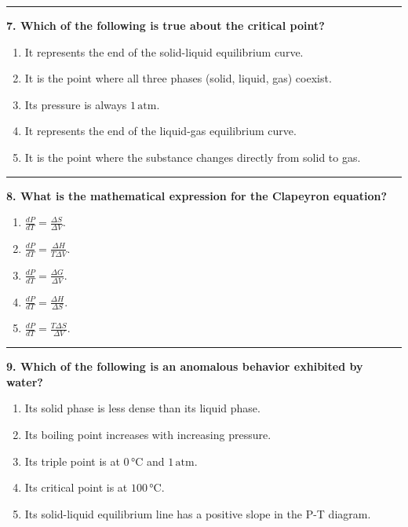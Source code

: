 \documentclass[
  9pt,
]{extbook}
\providecommand{\tightlist}{%
  \setlength{\itemsep}{0pt}\setlength{\parskip}{0pt}}
\theoremstyle{definition}
\theoremstyle{definition}
\theoremstyle{definition}
\theoremstyle{definition}
\theoremstyle{remark}
\begin{document}
\begin{center}\rule{0.5\linewidth}{0.5pt}\end{center}

\textbf{7. Which of the following is true about the critical point?}

\begin{enumerate}
\def\labelenumi{\alph{enumi}.}
\tightlist
\item
  It represents the end of the solid-liquid equilibrium curve.
\item
  It is the point where all three phases (solid, liquid, gas) coexist.
\item
  Its pressure is always \(1\,\text{atm}\).
\item
  It represents the end of the liquid-gas equilibrium curve.
\item
  It is the point where the substance changes directly from solid to gas.
\end{enumerate}

\begin{center}\rule{0.5\linewidth}{0.5pt}\end{center}

\textbf{8. What is the mathematical expression for the Clapeyron equation?}

\begin{enumerate}
\def\labelenumi{\alph{enumi}.}
\tightlist
\item
  \(\frac{dP}{dT} = \frac{\Delta S}{\Delta V}\).
\item
  \(\frac{dP}{dT} = \frac{\Delta H}{T\Delta V}\).
\item
  \(\frac{dP}{dT} = \frac{\Delta G}{\Delta V}\).
\item
  \(\frac{dP}{dT} = \frac{\Delta H}{\Delta S}\).
\item
  \(\frac{dP}{dT} = \frac{T\Delta S}{\Delta V}\).
\end{enumerate}

\begin{center}\rule{0.5\linewidth}{0.5pt}\end{center}

\textbf{9. Which of the following is an anomalous behavior exhibited by water?}

\begin{enumerate}
\def\labelenumi{\alph{enumi}.}
\tightlist
\item
  Its solid phase is less dense than its liquid phase.
\item
  Its boiling point increases with increasing pressure.
\item
  Its triple point is at \(0\,\text{°C}\) and \(1\,\text{atm}\).
\item
  Its critical point is at \(100\,\text{°C}\).
\item
  Its solid-liquid equilibrium line has a positive slope in the P-T diagram.
\end{enumerate}
\end{document}
